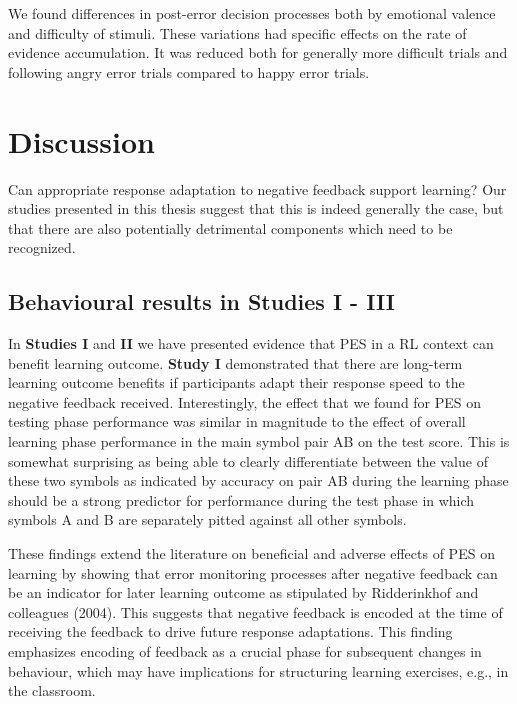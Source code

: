 \documentclass[12pt,openany]{book}
\theoremstyle{definition}
\theoremstyle{definition}
\theoremstyle{definition}
\theoremstyle{remark}
\begin{document}
We found differences in post-error decision processes both by emotional
valence and difficulty of stimuli. These variations had specific effects
on the rate of evidence accumulation. It was reduced both for generally
more difficult trials and following angry error trials compared to happy
error trials.

\chapter{Discussion}\label{discussion}

Can appropriate response adaptation to negative feedback support
learning? Our studies presented in this thesis suggest that this is
indeed generally the case, but that there are also potentially
detrimental components which need to be recognized.

\section{Behavioural results in Studies I -
III}\label{behavioural-results-in-studies-i---iii}

In \textbf{Studies I} and \textbf{II} we have presented evidence that
PES in a RL context can benefit learning outcome. \textbf{Study I}
demonstrated that there are long-term learning outcome benefits if
participants adapt their response speed to the negative feedback
received. Interestingly, the effect that we found for PES on testing
phase performance was similar in magnitude to the effect of overall
learning phase performance in the main symbol pair AB on the test score.
This is somewhat surprising as being able to clearly differentiate
between the value of these two symbols as indicated by accuracy on pair
AB during the learning phase should be a strong predictor for
performance during the test phase in which symbols A and B are
separately pitted against all other symbols.

These findings extend the literature on beneficial and adverse effects
of PES on learning by showing that error monitoring processes after
negative feedback can be an indicator for later learning outcome as
stipulated by Ridderinkhof and colleagues (2004). This suggests that
negative feedback is encoded at the time of receiving the feedback to
drive future response adaptations. This finding emphasizes encoding of
feedback as a crucial phase for subsequent changes in behaviour, which
may have implications for structuring learning exercises, e.g., in the
classroom.
\end{document}
